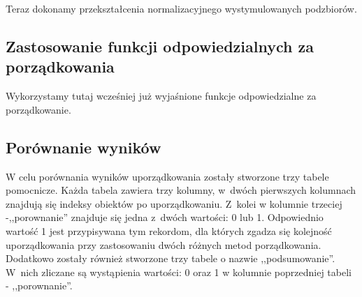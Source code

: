 \documentclass[12pt,a4paper]{report}
\begin{document}
{\begin{Shaded}
\begin{Highlighting}[]
\NormalTok{)}
\NormalTok{)}
\NormalTok{)}
\end{Highlighting}
\end{Shaded}

Teraz dokonamy przekształcenia normalizacyjnego wystymulowanych
podzbiorów.

\begin{Shaded}
\begin{Highlighting}[]
\end{Highlighting}
\end{Shaded}

\subsection{Zastosowanie funkcji odpowiedzialnych za porządkowania}
Wykorzystamy tutaj wcześniej już wyjaśnione funkcje odpowiedzialne za porządkowanie. 

\begin{Shaded}
\begin{Highlighting}[]
\end{Highlighting}
\end{Shaded}

\subsection{Porównanie wyników}\label{porownanie-3metody}
W celu porównania wyników uporządkowania zostały stworzone trzy tabele
pomocnicze. Każda tabela zawiera trzy kolumny, w~dwóch pierwszych
kolumnach znajdują się indeksy obiektów po uporządkowaniu. Z~kolei w
kolumnie trzeciej -,,porownanie'' znajduje się jedna z~dwóch wartości: 0
lub 1. Odpowiednio wartość 1 jest przypisywana tym rekordom, dla których
zgadza się kolejność uporządkowania przy zastosowaniu dwóch różnych
metod porządkowania. Dodatkowo zostały również stworzone trzy tabele o
nazwie ,,podsumowanie''. W~nich zliczane są wystąpienia wartości: 0 oraz 1 
w kolumnie poprzedniej tabeli - ,,porownanie''.

}
\end{document}
